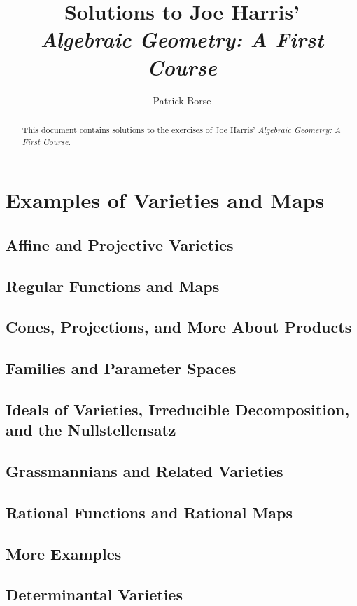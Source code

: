 \documentclass[oneside]{amsbook}
\title{Solutions to Joe Harris'\\ \emph{Algebraic Geometry: A First Course}}
\author{Patrick Borse}
\numberwithin{ex}{chapter}
\begin{document}
\begin{abstract}
This document contains solutions to the exercises of Joe Harris' \emph{Algebraic Geometry: A First Course}.
\end{abstract}

\maketitle

\tableofcontents

\part{Examples of Varieties and Maps}
\chapter{Affine and Projective Varieties}

\chapter{Regular Functions and Maps}

\chapter{Cones, Projections, and More About Products}

\chapter{Families and Parameter Spaces}

\chapter{Ideals of Varieties, Irreducible Decomposition, and the Nullstellensatz}

\chapter{Grassmannians and Related Varieties}

\chapter{Rational Functions and Rational Maps}

\chapter{More Examples}

\chapter{Determinantal Varieties}

\end{document}
